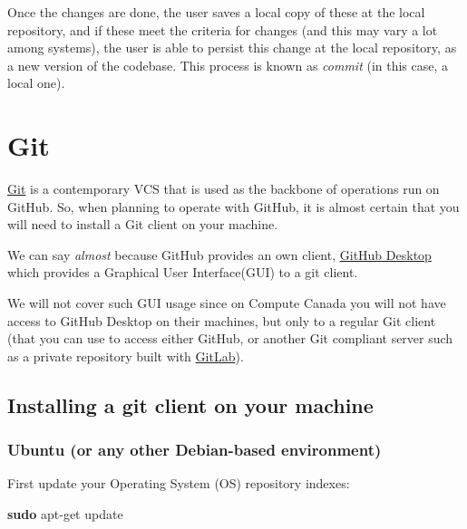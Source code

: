 \documentclass[
]{book}
\newenvironment{Shaded}{\begin{snugshade}}{\end{snugshade}}
\newcommand{\FunctionTok}[1]{\textcolor[rgb]{0.13,0.29,0.53}{\textbf{#1}}}
\newcommand{\NormalTok}[1]{#1}
\begin{document}
Once the changes are done, the user saves a local copy of these at the local repository,
and if these meet the criteria for changes (and this may vary a lot among systems),
the user is able to persist this change at the local repository, as a new version of
the codebase. This process is known as \emph{commit} (in this case, a local one).

\hypertarget{git}{%
\section{Git}\label{git}}

\href{https://git-scm.com/}{Git} is a contemporary VCS that is used as the backbone
of operations run on GitHub. So, when planning to operate with GitHub, it is
almost certain that you will need to install a Git client on your machine.

We can say \emph{almost} because GitHub provides an own client,
\href{https://desktop.github.com/}{GitHub Desktop} which provides a Graphical User
Interface(GUI) to a git client.

We will not cover such GUI usage since on Compute Canada you will not have access
to GitHub Desktop on their machines, but only to
a regular Git client (that you can use to access either GitHub, or another Git
compliant server such as a private repository built with
\href{https://about.gitlab.com/}{GitLab}).

\hypertarget{installing-a-git-client-on-your-machine}{%
\subsection{Installing a git client on your machine}\label{installing-a-git-client-on-your-machine}}

\hypertarget{ubuntu-or-any-other-debian-based-environment}{%
\subsubsection{Ubuntu (or any other Debian-based environment)}\label{ubuntu-or-any-other-debian-based-environment}}

First update your Operating System (OS) repository indexes:

\begin{Shaded}
\begin{Highlighting}[]
\FunctionTok{sudo}\NormalTok{ apt{-}get update}
\end{Highlighting}
\end{Shaded}
\end{document}
